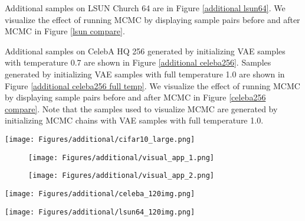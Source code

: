 \documentclass{article} \usepackage{iclr2021_conference,times}
\begin{document}
Additional samples on LSUN Church 64 are in Figure \ref{additional lsun64}. We visualize the effect of running MCMC by displaying sample pairs before and after MCMC in Figure \ref{lsun compare}.

Additional samples on CelebA HQ 256 generated by initializing VAE samples with temperature 0.7 are shown in Figure \ref{additional celeba256}. Samples generated by initializing VAE samples with full temperature 1.0 are shown in Figure \ref{additional celeba256 full temp}. We visualize the effect of running MCMC by displaying sample pairs before and after MCMC in Figure \ref{celeba256 compare}. Note that the samples used to visualize MCMC are generated by initializing MCMC chains with VAE samples with full temperature 1.0.

\begin{figure*}[ht]
    \centering
    \texttt{[image: Figures/additional/cifar10\_large.png]}
    \caption{\label{additional cifar}
     Additional CIFAR-10 samples}
\end{figure*}

\begin{figure*}[ht]
    \centering
    \begin{subfigure}{.45\linewidth}
    \texttt{[image: Figures/additional/visual\_app\_1.png]}
    \end{subfigure}
    \begin{subfigure}{.45\linewidth}
    \texttt{[image: Figures/additional/visual\_app\_2.png]}
    \end{subfigure}
\caption{Additional visualizations of MCMC chains when sampling from the model for CIFAR-10}\label{additional visualization}
\end{figure*}

\begin{figure*}[ht]
    \centering
    \texttt{[image: Figures/additional/celeba\_120img.png]}
    \caption{\label{additional celeba64}
     Additional CelebA 64 samples}
\end{figure*}

\begin{figure*}[ht]
    \centering
    \texttt{[image: Figures/additional/lsun64\_120img.png]}
    \caption{\label{additional lsun64}
     Additional LSUN Church 64 samples}
\end{figure*}
\end{document}
